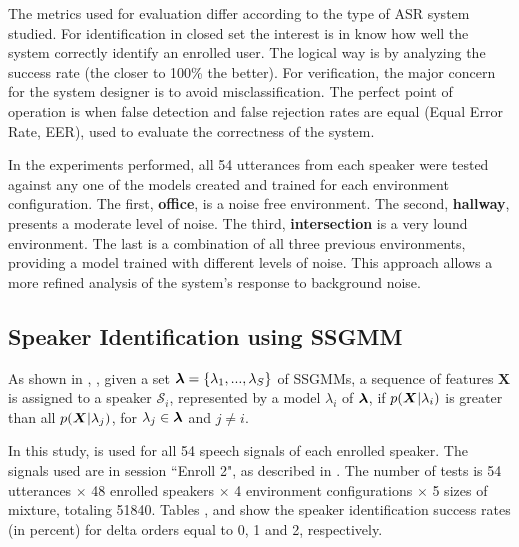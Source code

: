 The metrics used for evaluation differ according to the type of ASR system studied. For identification in closed set the interest is in know how well the system correctly identify an enrolled user. The logical way is by analyzing the success rate (the closer to 100\% the better). For verification, the major concern for the system designer is to avoid misclassification. The perfect point of operation is when false detection and false rejection rates are equal (Equal Error Rate, EER), used to evaluate the correctness of the system.

In the experiments performed, all 54 utterances from each speaker were tested against any one of the models created and trained for each environment configuration. The first, \textbf{office}, is a noise free environment. The second, \textbf{hallway}, presents a moderate level of noise. The third, \textbf{intersection} is a very lound environment. The last is a combination of all three previous environments, providing a model trained with different levels of noise. This approach allows a more refined analysis of the system's response to background noise.

\subsection{Speaker Identification using SSGMM}

As shown in , , given a set $\boldsymbol{\lambda} = \{\lambda_1, ..., \lambda_S\}$ of SSGMMs, a sequence of features $\boldsymbol{X}$ is assigned to a speaker $\mathcal{S}_i$, represented by a model $\lambda_i$ of $\boldsymbol{\lambda}$, if $p(\boldsymbol{X}|\lambda_i)$ is greater than all $p(\boldsymbol{X}|\lambda_j)$, for $\lambda_j \in \boldsymbol{\lambda}$ and $j \ne i$.

In this study,  is used for all 54 speech signals of each enrolled speaker. The signals used are in session ``Enroll 2", as described in . The number of tests is 54 utterances $\times$ 48 enrolled speakers $\times$ 4 environment configurations $\times$ 5 sizes of mixture, totaling 51840. Tables ,  and  show the speaker identification success rates (in percent) for delta orders equal to 0, 1 and 2, respectively.





